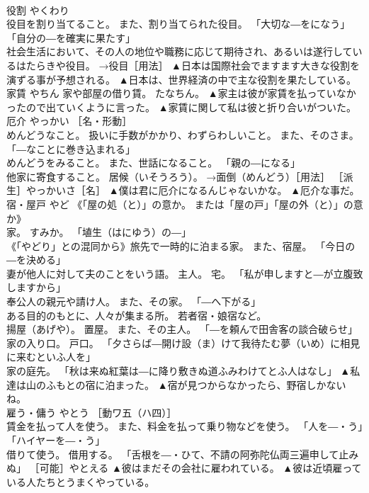 \documentclass[8pt]{extreport}
\begin{document}
\begin{CJK}{UTF8}{min}
\\	役割	やくわり	
\\	役目を割り当てること。 また、割り当てられた役目。 「大切な―をになう」「自分の―を確実に果たす」 
\\	社会生活において、その人の地位や職務に応じて期待され、あるいは遂行しているはたらきや役目。 →役目［用法］	▲日本は国際社会でますます大きな役割を演ずる事が予想される。 ▲日本は、世界経済の中で主な役割を果たしている。
\\	家賃	やちん	家や部屋の借り賃。 たなちん。	▲家主は彼が家賃を払っていなかったので出ていくように言った。 ▲家賃に関して私は彼と折り合いがついた。
\\	厄介	やっかい	［名・形動］ 
\\	めんどうなこと。 扱いに手数がかかり、わずらわしいこと。 また、そのさま。 「―なことに巻き込まれる」 
\\	めんどうをみること。 また、世話になること。 「親の―になる」 
\\	他家に寄食すること。 居候（いそうろう）。 →面倒（めんどう）［用法］ ［派生］やっかいさ［名］	▲僕は君に厄介になるんじゃないかな。 ▲厄介な事だ。
\\	宿・屋戸	やど	《「屋の処（と）」の意か。 または「屋の戸」「屋の外（と）」の意か》 
\\	家。 すみか。 「埴生（はにゆう）の―」 
\\	《「やどり」との混同から》旅先で一時的に泊まる家。 また、宿屋。 「今日の―を決める」 
\\	妻が他人に対して夫のことをいう語。 主人。 宅。 「私が申しますと―が立腹致しますから」 
\\	奉公人の親元や請け人。 また、その家。 「―へ下がる」 
\\	ある目的のもとに、人々が集まる所。 若者宿・娘宿など。 
\\	揚屋（あげや）。 置屋。 また、その主人。 「―を頼んで田舎客の談合破らせ」 
\\	家の入り口。 戸口。 「夕さらば―開け設（ま）けて我待たむ夢（いめ）に相見に来むといふ人を」 
\\	家の庭先。 「秋は来ぬ紅葉は―に降り敷きぬ道ふみわけてとふ人はなし」	▲私達は山のふもとの宿に泊まった。 ▲宿が見つからなかったら、野宿しかないね。
\\	雇う・傭う	やとう	［動ワ五（ハ四）］ 
\\	賃金を払って人を使う。 また、料金を払って乗り物などを使う。 「人を―・う」「ハイヤーを―・う」 
\\	借りて使う。 借用する。 「舌根を―・ひて、不請の阿弥陀仏両三遍申して止みぬ」 ［可能］やとえる	▲彼はまだその会社に雇われている。 ▲彼は近頃雇っている人たちとうまくやっている。

\end{CJK}
\end{document}
